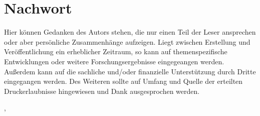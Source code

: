 \section*{Nachwort}\label{sec:nachwort}


Hier können Gedanken des Autors stehen, die nur einen Teil der Leser ansprechen oder aber persönliche Zusammenhänge aufzeigen.
Liegt zwischen Erstellung und Veröffentlichung ein erheblicher Zeitraum, so kann auf themenspezifische Entwicklungen oder weitere Forschungsergebnisse eingegeangen werden.
Außerdem kann auf die sachliche und/oder finanzielle Unterstützung durch Dritte eingegangen werden.
Des Weiteren sollte auf Umfang und Quelle der erteilten Druckerlaubnisse hingewiesen und Dank ausgesprochen werden.


\vspace{0.5cm}

\begingroup
\raggedright{\epiloguelocation, \epiloguedate}
\hfill
\raggedleft{\textit{\thesisauthor}}
\raggedright
\endgroup